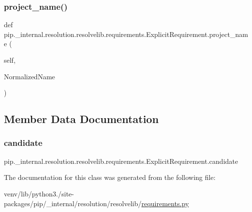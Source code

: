 \subsubsection{\texorpdfstring{project\+\_\+name()}{project\_name()}}
{\footnotesize\ttfamily def pip.\+\_\+internal.\+resolution.\+resolvelib.\+requirements.\+Explicit\+Requirement.\+project\+\_\+name (\begin{DoxyParamCaption}\item[{}]{self,  }\item[{}]{Normalized\+Name }\end{DoxyParamCaption})}



\subsection{Member Data Documentation}
\mbox{\label{classpip_1_1__internal_1_1resolution_1_1resolvelib_1_1requirements_1_1ExplicitRequirement_a9919e92037563e000e8bf377e0fbcc15}} 
\subsubsection{\texorpdfstring{candidate}{candidate}}
{\footnotesize\ttfamily pip.\+\_\+internal.\+resolution.\+resolvelib.\+requirements.\+Explicit\+Requirement.\+candidate}



The documentation for this class was generated from the following file\+:\begin{DoxyCompactItemize}
\item 
venv/lib/python3./site-\/packages/pip/\+\_\+internal/resolution/resolvelib/\hyperlink{pip_2__internal_2resolution_2resolvelib_2requirements_8py}{requirements.\+py}\end{DoxyCompactItemize}
